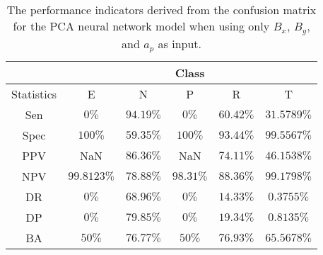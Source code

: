\begin{table}[!ht]
	\centering
	\begin{tabular}{|c|c|c|c|c|c|}
		\hline
		 & \multicolumn{5}{c|}{Class} \\ \hline
		Statistics & E & N & P & R & T \\ \hline
		Sen & $0\%$ & $94.19\%$ & $0\%$ & $60.42\%$ & $31.5789\%$ \\ \hline
		Spec & $100\%$ & $59.35\%$ & $100\%$ & $93.44\%$ & $99.5567\%$ \\ \hline
		PPV & NaN & $86.36\%$ & NaN & $74.11\%$ & $46.1538\%$ \\ \hline
		NPV & $99.8123\%$ & $78.88\%$ & $98.31\%$ & $88.36\%$ & $99.1798\%$ \\ \hline
		DR & $0\%$ & $68.96\%$ & $0\%$ & $14.33\%$ & $0.3755\%$ \\ \hline
		DP & $0\%$ & $79.85\%$ & $0\%$ & $19.34\%$ & $0.8135\%$ \\ \hline
		BA & $50\%$ & $76.77\%$ & $50\%$ & $76.93\%$ & $65.5678\%$ \\ \hline
	\end{tabular}
	\caption{The performance indicators derived from the confusion matrix for the PCA neural network model when using only $B_{x}$, $B_{y}$, and $a_{p}$ as input.}
	\label{tab:cs:reverse:xyap:pcaNNet}
\end{table}
